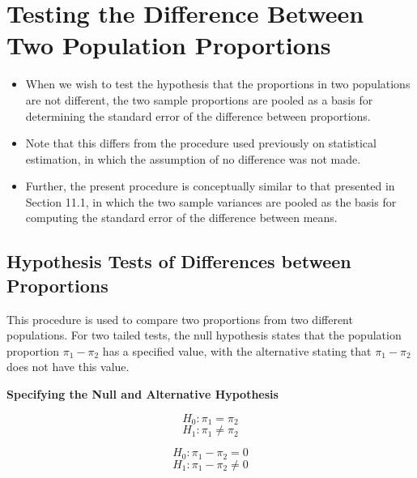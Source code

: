 \documentclass[]{report}
\begin{document}
\section{Testing the Difference Between Two Population Proportions}
\begin{itemize}
\item When we wish to test the hypothesis that the proportions in two populations are not different, the two sample proportions are pooled as a basis for determining the standard error of the
difference between proportions.

\item Note that this differs from the procedure used previously on statistical estimation, in which
the assumption of no difference was not made.

\item Further, the present procedure is conceptually similar to that presented in Section 11.1, in which the two sample variances are pooled as the basis for computing the standard error of the difference between means.
\end{itemize}




\subsection{Hypothesis Tests of Differences between Proportions }


This procedure is used to compare two proportions from two different populations. For two tailed tests, the null hypothesis states that the population proportion $\pi_1-\pi_2$ has a specified value, with the alternative stating that  $\pi_1-\pi_2$ does not have this value. 



\begin{framed}
\noindent \textbf{Specifying the Null and Alternative Hypothesis}\\

\begin{multicols}{2}
\[H_0 : \pi_1 = \pi_2\]
\[H_1 : \pi_1 \neq \pi_2\]

\[H_0 : \pi_1 - \pi_2 = 0\]
\[H_1 : \pi_1 -  \pi_2 \neq 0\]

\end{multicols}
\end{framed}
\end{document}
